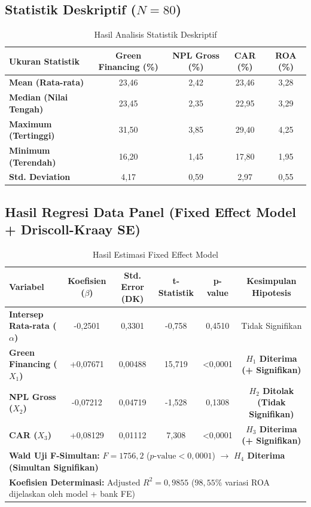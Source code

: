 \documentclass[11pt,a4paper]{article}
\begin{document}
\subsection{Statistik Deskriptif ($N = 80$)}
\begin{table}[htbp]
\centering
\small
\renewcommand{\arraystretch}{1.2}
\caption{Hasil Analisis Statistik Deskriptif}
\begin{tabular}{lcccc}
\toprule
\rowcolor{tableHeaderBg}
\textbf{Ukuran Statistik} & \textbf{Green Financing (\%)} & \textbf{NPL Gross (\%)} & \textbf{CAR (\%)} & \textbf{ROA (\%)} \\
\midrule
\textbf{Mean (Rata-rata)} & 23,46 & 2,42 & 23,46 & 3,28 \\
\textbf{Median (Nilai Tengah)} & 23,45 & 2,35 & 22,95 & 3,29 \\
\textbf{Maximum (Tertinggi)} & 31,50 & 3,85 & 29,40 & 4,25 \\
\textbf{Minimum (Terendah)} & 16,20 & 1,45 & 17,80 & 1,95 \\
\textbf{Std. Deviation} & 4,17 & 0,59 & 2,97 & 0,55 \\
\bottomrule
\end{tabular}
\end{table}

\subsection{Hasil Regresi Data Panel (Fixed Effect Model + Driscoll-Kraay SE)}
\begin{table}[htbp]
\centering
\small
\renewcommand{\arraystretch}{1.25}
\caption{Hasil Estimasi Fixed Effect Model}
\begin{tabular}{lccccc}
\toprule
\rowcolor{tableHeaderBg}
\textbf{Variabel} & \textbf{Koefisien ($\beta$)} & \textbf{Std. Error (DK)} & \textbf{t-Statistik} & \textbf{p-value} & \textbf{Kesimpulan Hipotesis} \\
\midrule
\textbf{Intersep Rata-rata ($\alpha$)} & -0,2501 & 0,3301 & -0,758 & 0,4510 & Tidak Signifikan \\
\textbf{Green Financing ($X_1$)} & +0,07671 & 0,00488 & 15,719 & <0,0001 & \textbf{$H_1$ Diterima (+ Signifikan)} \\
\textbf{NPL Gross ($X_2$)} & -0,07212 & 0,04719 & -1,528 & 0,1308 & \textbf{$H_2$ Ditolak (Tidak Signifikan)} \\
\textbf{CAR ($X_3$)} & +0,08129 & 0,01112 & 7,308 & <0,0001 & \textbf{$H_3$ Diterima (+ Signifikan)} \\
\midrule
\multicolumn{6}{l}{\textbf{Wald Uji F-Simultan:} $F = 1756{,}2$ \quad ($p\text{-value} < 0{,}0001$) $\rightarrow$ \textbf{$H_4$ Diterima (Simultan Signifikan)}} \\
\multicolumn{6}{l}{\textbf{Koefisien Determinasi:} $\text{Adjusted } R^2 = 0{,}9855$ ($98{,}55\%$ variasi ROA dijelaskan oleh model + bank FE)} \\
\bottomrule
\end{tabular}
\end{table}
\end{document}
